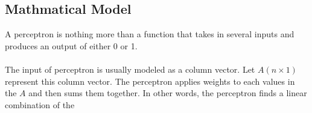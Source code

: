 \subsection{Mathmatical Model}	
		
		A perceptron is nothing more than a function that takes in several inputs and produces an output of either 0 or 1. \\ \\
		The input of perceptron is usually modeled as a column vector. Let $A(n\times1)$ represent this column vector. The perceptron applies weights to each values in the $A$ and then sums them together. In other words, the perceptron finds a linear combination of the 